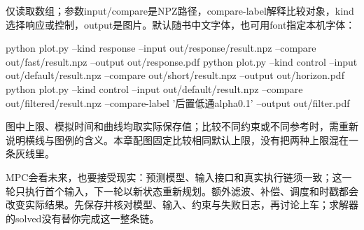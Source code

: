 \begin{example}[用同一批输出画图]
仅读取数组；参数input/compare是NPZ路径，compare-label解释比较对象，kind选择响应或控制，output是图片。默认随书中文字体，也可用font指定本机字体：

\begin{tbash}
python plot.py --kind response --input out/response/result.npz --compare out/fast/result.npz --output out/response.pdf
python plot.py --kind control --input out/default/result.npz --compare out/short/result.npz --output out/horizon.pdf
python plot.py --kind control --input out/default/result.npz --compare out/filtered/result.npz --compare-label '后置低通alpha0.1' --output out/filter.pdf
\end{tbash}
图中上限、模拟时间和曲线均取实际保存值；比较不同约束或不同参考时，需重新说明横线与图例的含义。本章配图固定比较相同默认上限，没有把两种上限混在一条灰线里。
\end{example}
\begin{conclusion}
MPC会看未来，也要接受现实：预测模型、输入接口和真实执行链须一致；这一轮只执行首个输入，下一轮以新状态重新规划。额外滤波、补偿、调度和时戳都会改变实际结果。先保存并核对模型、输入、约束与失败日志，再讨论上车；求解器的solved没有替你完成这一整条链。
\end{conclusion}
